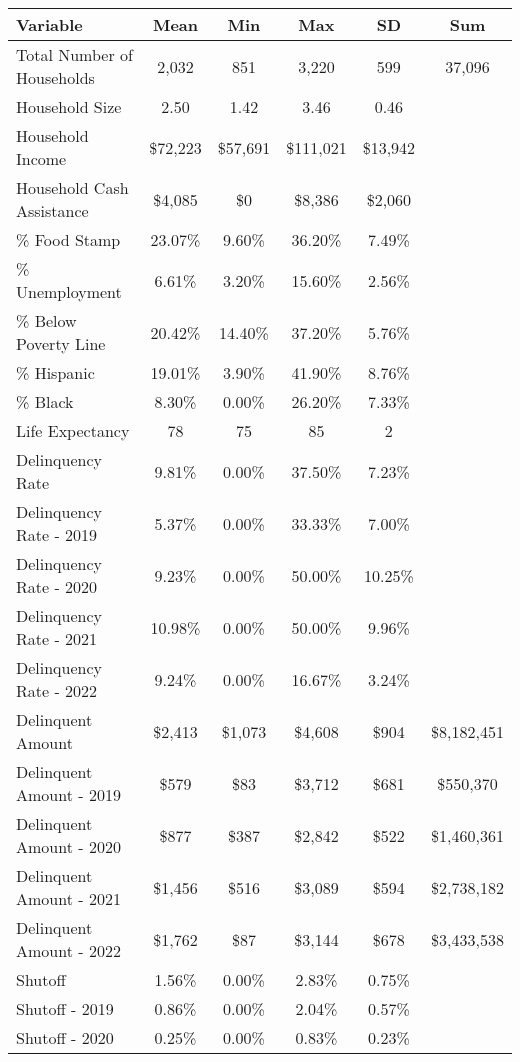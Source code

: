 \begin{tabular}{l|c|c|c|c|c}
\toprule 
\midrule 
Variable & Mean & Min & Max & SD & Sum \\
\midrule 
Total Number of Households & 2,032 & 851 & 3,220 & 599 & 37,096 \\
\quad Household Size & 2.50 & 1.42 & 3.46 & 0.46 \\
Household Income & \$72,223 & \$57,691 & \$111,021 & \$13,942 \\
\quad Household Cash Assistance & \$4,085 & \$0 & \$8,386 & \$2,060 \\
\% Food Stamp & 23.07\% & 9.60\% & 36.20\% & 7.49\% \\
\% Unemployment & 6.61\% & 3.20\% & 15.60\% & 2.56\% \\
\% Below Poverty Line & 20.42\% & 14.40\% & 37.20\% & 5.76\% \\
\% Hispanic & 19.01\% & 3.90\% & 41.90\% & 8.76\% \\
\% Black & 8.30\% & 0.00\% & 26.20\% & 7.33\% \\
Life Expectancy & 78 & 75 & 85 & 2 \\
\midrule 
Delinquency Rate & 9.81\% & 0.00\% & 37.50\% & 7.23\% \\
\quad Delinquency Rate - 2019 & 5.37\% & 0.00\% & 33.33\% & 7.00\% \\
\quad Delinquency Rate - 2020 & 9.23\% & 0.00\% & 50.00\% & 10.25\% \\
\quad Delinquency Rate - 2021 & 10.98\% & 0.00\% & 50.00\% & 9.96\% \\
\quad Delinquency Rate - 2022 & 9.24\% & 0.00\% & 16.67\% & 3.24\% \\
\midrule 
Delinquent Amount & \$2,413 & \$1,073 & \$4,608 & \$904 & \$8,182,451 \\
\quad Delinquent Amount - 2019 & \$579 & \$83 & \$3,712 & \$681 & \$550,370 \\
\quad Delinquent Amount - 2020 & \$877 & \$387 & \$2,842 & \$522 & \$1,460,361 \\
\quad Delinquent Amount - 2021 & \$1,456 & \$516 & \$3,089 & \$594 & \$2,738,182 \\
\quad Delinquent Amount - 2022 & \$1,762 & \$87 & \$3,144 & \$678 & \$3,433,538 \\
\midrule 
Shutoff & 1.56\% & 0.00\% & 2.83\% & 0.75\% \\
\quad Shutoff - 2019 & 0.86\% & 0.00\% & 2.04\% & 0.57\% \\
\quad Shutoff - 2020 & 0.25\% & 0.00\% & 0.83\% & 0.23\% \\

\end{tabular}
